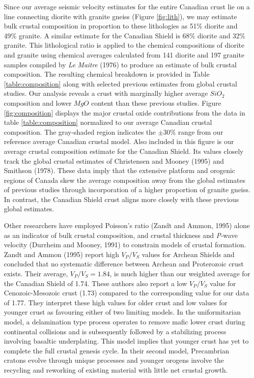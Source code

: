 \documentclass[msc,oneside]{ubcthesis}
\begin{document}
Since our average seismic velocity estimates for the entire Canadian crust lie on a line connecting diorite with granite gneiss (Figure \ref{fig:lith}), we may estimate bulk crustal composition in proportion to these lithologies as 51\% diorite and 49\% granite. A similar estimate for the Canadian Shield is 68\% diorite and 32\% granite. This lithological ratio is applied to the chemical compositions of diorite and granite using chemical averages calculated from 141 diorite and 197 granite samples compiled by {\it Le Maitre} (1976) to produce an estimate of bulk crustal composition. The resulting chemical breakdown is provided in Table \ref{table:composition} along with selected previous estimates from global crustal studies. Our analysis reveals a crust with marginally higher average $SiO_2$ composition and lower $MgO$ content than these previous studies. Figure \ref{fig:composition} displays the major crustal oxide contributions from the data in table \ref{table:composition} normalized to our average Canadian crustal composition. The gray-shaded region indicates the $\pm 30\%$ range from our reference average Canadian crustal model.  Also included in this figure is our average crustal composition estimate for the Canadian Shield. Its values closely track the global crustal estimates of Christensen and Mooney (1995) and Smithson (1978). These data imply that the extensive platform and orogenic regions of Canada skew the average composition away from the global estimates of previous studies through incorporation of a higher proportion of granite gneiss. In contrast, the Canadian Shield crust aligns more closely with these previous global estimates.

Other researchers have employed Poisson's ratio (Zandt and Ammon, 1995) alone as an indicator of bulk crustal composition, and crustal thickness and {\it P}-wave velocity (Durrheim and Mooney, 1991) to constrain models of crustal formation. Zandt and Ammon (1995) report high $V_P/V_S$ values for Archean Shields and concluded that no systematic difference between Archean and Proterozoic crust exists. Their average, $V_P/V_S=1.84$, is much higher than our weighted average for the Canadian Shield of 1.74. These authors also report a low $V_P/V_S$ value for Cenozoic-Mesozoic crust (1.73) compared to the corresponding value for our data of 1.77. They interpret these high values for older crust and low values for younger crust as favouring either of two limiting models. In the uniformitarian model, a delamination type process operates to remove mafic lower crust during continental collisions and is subsequently followed by a stabilizing process involving basaltic underplating. This model implies that younger crust has yet to complete the full crustal genesis cycle. In their second model, Precambrian cratons evolve through unique processes and younger orogens involve the recycling and reworking of existing material with little net crustal growth.
\end{document}
